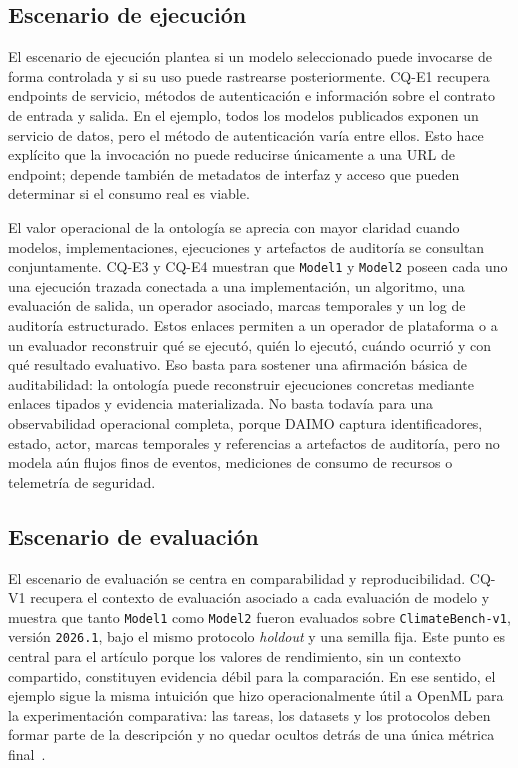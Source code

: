 \documentclass[11pt,a4paper]{article}
\newcommand{\cq}[1]{\textsf{#1}}
\begin{document}
\subsection{Escenario de ejecución}

El escenario de ejecución plantea si un modelo seleccionado puede invocarse de forma controlada y si su uso puede rastrearse posteriormente. \cq{CQ-E1} recupera endpoints de servicio, métodos de autenticación e información sobre el contrato de entrada y salida. En el ejemplo, todos los modelos publicados exponen un servicio de datos, pero el método de autenticación varía entre ellos. Esto hace explícito que la invocación no puede reducirse únicamente a una URL de endpoint; depende también de metadatos de interfaz y acceso que pueden determinar si el consumo real es viable.

El valor operacional de la ontología se aprecia con mayor claridad cuando modelos, implementaciones, ejecuciones y artefactos de auditoría se consultan conjuntamente. \cq{CQ-E3} y \cq{CQ-E4} muestran que \texttt{Model1} y \texttt{Model2} poseen cada uno una ejecución trazada conectada a una implementación, un algoritmo, una evaluación de salida, un operador asociado, marcas temporales y un log de auditoría estructurado. Estos enlaces permiten a un operador de plataforma o a un evaluador reconstruir qué se ejecutó, quién lo ejecutó, cuándo ocurrió y con qué resultado evaluativo. Eso basta para sostener una afirmación básica de auditabilidad: la ontología puede reconstruir ejecuciones concretas mediante enlaces tipados y evidencia materializada. No basta todavía para una observabilidad operacional completa, porque DAIMO captura identificadores, estado, actor, marcas temporales y referencias a artefactos de auditoría, pero no modela aún flujos finos de eventos, mediciones de consumo de recursos o telemetría de seguridad.

\subsection{Escenario de evaluación}

El escenario de evaluación se centra en comparabilidad y reproducibilidad. \cq{CQ-V1} recupera el contexto de evaluación asociado a cada evaluación de modelo y muestra que tanto \texttt{Model1} como \texttt{Model2} fueron evaluados sobre \texttt{ClimateBench-v1}, versión \texttt{2026.1}, bajo el mismo protocolo \emph{holdout} y una semilla fija. Este punto es central para el artículo porque los valores de rendimiento, sin un contexto compartido, constituyen evidencia débil para la comparación. En ese sentido, el ejemplo sigue la misma intuición que hizo operacionalmente útil a OpenML para la experimentación comparativa: las tareas, los datasets y los protocolos deben formar parte de la descripción y no quedar ocultos detrás de una única métrica final~\cite{openml}.
\end{document}
